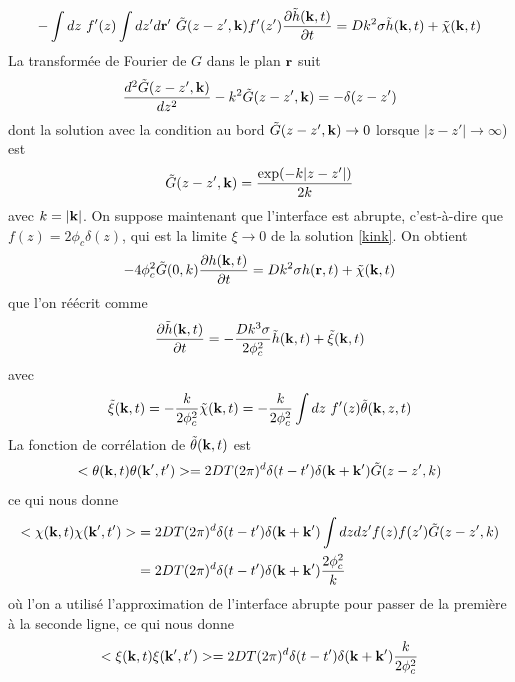 \begin{align}
    -\int dz \ f'(z)\int dz'd{\bf r}'\ \tilde G(z-z',{\bf k}) f'(z')\frac{\partial\tilde h({\bf k},t)}{\partial t} = 
Dk^2\sigma \tilde h({\bf k},t) + \tilde \chi({\bf k},t)
    \label{bstep}
\end{align}
La transformée de Fourier de $G$ dans le plan ${\bf r}$ suit
\begin{align}
    \frac{d^2 \tilde G(z-z',{\bf k} )}{dz^2}-k^2 \tilde G(z-z',{\bf k} )=-\delta(z-z')
\end{align}
dont la solution avec la condition au bord $\tilde G(z-z',{\bf k} )\to 0$ lorsque $|z-z'|\to\infty$)  est
\begin{align}
    \tilde G(z-z',{\bf k}) = \frac{\exp(-k|z-z'|)}{2k}
\end{align}
avec $k=|{\bf k}|$. On suppose maintenant que l'interface est abrupte, c'est-à-dire que $f(z) = 2\phi_c \delta(z)$, qui est la limite $\xi \to 0$ de la solution \ref{kink}. On obtient
\begin{align}
    -4\phi_c^2 \tilde G(0,k) \frac{\partial h({\bf k},t)}{\partial t} = Dk^2\sigma  h({\bf r},t) + \tilde \chi({\bf k},t)
\end{align}
que l'on réécrit comme
\begin{align}
    \frac{\partial \tilde h({\bf k},t)}{\partial t} = -\frac{Dk^3\sigma}{2\phi_c^2} \tilde h({\bf k},t) + \tilde \xi({\bf k},t)
\end{align}
avec
\begin{align}
    \tilde \xi({\bf k},t)= - \frac{k}{2\phi_c^2}\tilde \chi({\bf k},t)=  - \frac{k}{2\phi_c^2} \int dz\  f'(z) \tilde\theta({\bf k},z,t)
\end{align}
La fonction de corrélation de $\tilde \theta({\bf k},t)$ est
\begin{align}
    < \theta({\bf k},t)\theta({\bf k}',t')> = 2DT(2\pi)^d \delta(t-t') \delta({\bf k}+{\bf k'}) \tilde G(z-z',k)
\end{align}
ce qui nous donne
\begin{align}
    < \chi({\bf k},t)\chi({\bf k}',t')>  &= 2DT(2\pi)^d \delta(t-t') \delta({\bf k}+{\bf k'}) \int dz dz' f(z) f(z') \tilde G(z-z',k) \nonumber \\
 &= 2DT(2\pi)^d \delta(t-t') \delta({\bf k}+{\bf k'}) \frac{2\phi_c^2}{k}
\end{align}
où l'on a utilisé l'approximation de l'interface abrupte pour passer de la première à la seconde ligne, ce qui nous donne
\begin{align}
    < \xi({\bf k},t)\xi({\bf k}',t')> = 2DT(2\pi)^d \delta(t-t') \delta({\bf k}+{\bf k'}) \frac{k}{2\phi_c^2}
\end{align}
